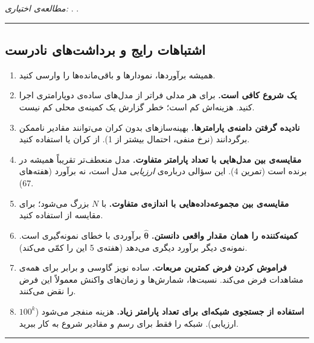 \emph{مطالعه‌ی اختیاری:}  \emph{}. 
\emph{}.

\begin{center}\rule{0.5\linewidth}{0.5pt}\end{center}

\subsection{اشتباهات رایج و برداشت‌های نادرست}

\begin{enumerate}
\def\labelenumi{\arabic{enumi}.}
\tightlist
\item
  همیشه برآوردها، نمودارها و باقی‌مانده‌ها را وارسی کنید.
\item
  \textbf{یک شروع کافی است.} برای هر مدلی فراتر از مدل‌های ساده‌ی
  دوپارامتری  اجرا کنید. هزینه‌اش کم است؛ خطر گزارش یک
  کمینه‌ی محلی کم نیست.
\item
  \textbf{نادیده گرفتن دامنه‌ی پارامترها.} بهینه‌سازهای بدون کران می‌توانند
  مقادیر ناممکن برگردانند (نرخ منفی، احتمال بیشتر از 1). از کران یا
   استفاده کنید.
\item
  \textbf{مقایسه‌ی  بین مدل‌هایی با تعداد پارامتر متفاوت.} مدل
  منعطف‌تر تقریباً همیشه در  برنده است (تمرین 4). این سؤالی
  درباره‌ی \emph{ارزیابی} مدل است، نه برآورد (هفته‌های 6\lr{--}7).
\item
  \textbf{مقایسه‌ی  بین مجموعه‌داده‌هایی با اندازه‌ی متفاوت.}
   با \(N\) بزرگ می‌شود؛ برای مقایسه از  استفاده کنید.
\item
  \textbf{کمینه‌کننده را همان مقدار واقعی دانستن.}
  \(\hat{\boldsymbol\theta}\) برآوردی با خطای نمونه‌گیری است. نمونه‌ی دیگر
  برآورد دیگری می‌دهد (هفته‌ی 5 این را کمّی می‌کند).
\item
  \textbf{فراموش کردن فرض کمترین مربعات.}  ساده نویز گاوسی و
  برابر برای همه‌ی مشاهدات فرض می‌کند. نسبت‌ها، شمارش‌ها و زمان‌های واکنش
  معمولاً این فرض را نقض می‌کنند.
\item
  \textbf{استفاده از جستجوی شبکه‌ای برای تعداد پارامتر زیاد.} هزینه منفجر
  می‌شود (\(100^k\) ارزیابی). شبکه را فقط برای رسم و مقادیر شروع به کار
  ببرید.
\end{enumerate}

\begin{center}\rule{0.5\linewidth}{0.5pt}\end{center}

